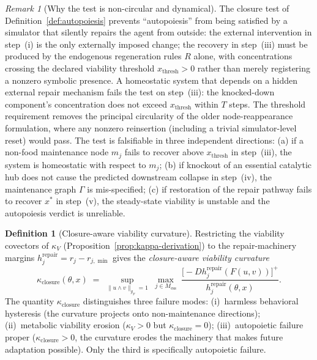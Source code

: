 \documentclass[11pt,a4paper]{article}
\theoremstyle{plain}
\theoremstyle{definition}
\newtheorem{definition}[theorem]{Definition}
\theoremstyle{remark}
\newtheorem{remark}[theorem]{Remark}
\newcommand{\kk}{\kappa_{\!V}}
\begin{document}
\begin{remark}[Why the test is non-circular and dynamical]
The closure test of Definition~\ref{def:autopoiesis} prevents
``autopoiesis'' from being satisfied by a simulator that silently
repairs the agent from outside: the external intervention in step~(i)
is the only externally imposed change; the recovery in step~(iii) must
be produced by the endogenous regeneration rules $R$ alone, with
concentrations crossing the declared viability threshold
$x_{\mathrm{thresh}} > 0$ rather than merely registering a nonzero
symbolic presence. A homeostatic system that depends on a hidden
external repair mechanism fails the test on step~(iii): the knocked-down
component's concentration does not exceed $x_{\mathrm{thresh}}$ within
$T$ steps. The threshold requirement removes the principal circularity
of the older node-reappearance formulation, where any nonzero
reinsertion (including a trivial simulator-level reset) would pass.
The test is falsifiable in three independent directions: (a) if a
non-food maintenance node $m_j$ fails to recover above
$x_{\mathrm{thresh}}$ in step~(iii), the system is homeostatic with
respect to $m_j$; (b) if knockout of an essential catalytic hub does
not cause the predicted downstream collapse in step~(iv), the
maintenance graph $\Gamma$ is mis-specified; (c) if restoration of
the repair pathway fails to recover $x^*$ in step~(v), the
steady-state viability is unstable and the autopoiesis verdict is
unreliable.
\end{remark}

\begin{definition}[Closure-aware viability curvature]
\label{def:kappa-closure}
Restricting the viability covectors of $\kk$
(Proposition~\ref{prop:kappa-derivation}) to the repair-machinery
margins $h_j^{\mathrm{repair}} = r_j - r_{j,\min}$ gives the
\emph{closure-aware viability curvature}
\begin{equation}\label{eq:kappa-closure}
  \kappa_{\mathrm{closure}}(\theta, x) \;=\;
  \sup_{\|u \wedge v\|_{g_F} = 1}\;
  \max_{j \in M_{\mathrm{ess}}}\;
  \frac{\bigl[-D h_j^{\mathrm{repair}}(F(u, v))\bigr]^+}{h_j^{\mathrm{repair}}(\theta, x)}.
\end{equation}
The quantity $\kappa_{\mathrm{closure}}$ distinguishes three failure
modes: (i)~harmless behavioral hysteresis (the curvature projects onto
non-maintenance directions); (ii)~metabolic viability erosion
($\kk > 0$ but $\kappa_{\mathrm{closure}} = 0$); (iii)~autopoietic
failure proper ($\kappa_{\mathrm{closure}} > 0$, the curvature erodes
the machinery that makes future adaptation possible). Only the third
is specifically autopoietic failure.
\end{definition}
\end{document}
